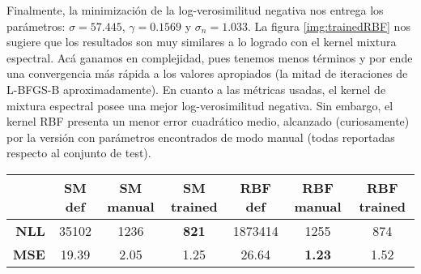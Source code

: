 \documentclass[letterpaper,11pt,oneside]{article}
\theoremstyle{break}
\begin{document}
Finalmente, la minimización de la log-verosimilitud negativa nos entrega los parámetros: $\sigma = 57.445$, $\gamma = 0.1569$ y $\sigma_n = 1.033$. La figura \ref{img:trainedRBF} nos sugiere que los resultados son muy similares a lo logrado con el kernel mixtura espectral. Acá ganamos en complejidad, pues tenemos menos términos y por ende una convergencia más rápida a los valores apropiados (la mitad de iteraciones de L-BFGS-B aproximadamente). En cuanto a las métricas usadas, el kernel de mixtura espectral posee una mejor log-verosimilitud negativa. Sin embargo, el kernel RBF presenta un menor error cuadrático medio, alcanzado (curiosamente) por la versión con parámetros encontrados de modo manual (todas reportadas respecto al conjunto de test).


\tiny
\begin{table}
\begin{tabular}{|r|c|c|c|c|c|c|}
\hline
\multicolumn{1}{|c|}{} & \textbf{SM def} & \textbf{SM manual} & \textbf{SM trained} & \textbf{RBF def} & \textbf{RBF manual} & \textbf{RBF trained} \\ \hline
\textbf{NLL}                  & 35102           & 1236               & \textbf{821}      & 1873414          & 1255                & 874                \\ \hline
\textbf{MSE}                  & 19.39           & 2.05               & 1.25              & 26.64            & \textbf{1.23}       & 1.52               \\ \hline
\end{tabular}
\end{table}


\end{document}
